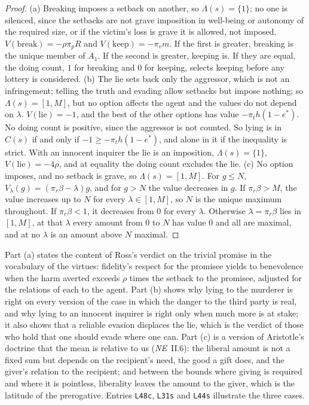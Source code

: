\documentclass{situationist-preprint}
\newcommand{\Ch}{C}
\begin{document}
\begin{proof}
(a) Breaking imposes a setback on another, so $\Lambda(s)=\{1\}$; no one is silenced, since the setbacks are not grave imposition in well-being or autonomy of the required size, or if the victim's loss is grave it is allowed, not imposed. $V(\text{break})=-\rho\pi_pR$ and $V(\text{keep})=-\pi_vm$. If the first is greater, breaking is the unique member of $A_1$. If the second is greater, keeping is. If they are equal, the doing count, $1$ for breaking and $0$ for keeping, selects keeping before any lottery is considered. (b) The lie sets back only the aggressor, which is not an infringement; telling the truth and evading allow setbacks but impose nothing; so $\Lambda(s)=[1,M]$, but no option affects the agent and the values do not depend on $\lambda$. $V(\text{lie})=-1$, and the best of the other options has value $-\pi_th(1-e^\ast)$. No doing count is positive, since the aggressor is not counted. So lying is in $\Ch(s)$ if and only if $-1\geq-\pi_th(1-e^\ast)$, and alone in it if the inequality is strict. With an innocent inquirer the lie is an imposition, $\Lambda(s)=\{1\}$, $V(\text{lie})=-4\rho$, and at equality the doing count excludes the lie. (c) No option imposes, and no setback is grave, so $\Lambda(s)=[1,M]$. For $g\leq N$, $V_\lambda(g)=(\pi_r\beta-\lambda)g$, and for $g>N$ the value decreases in $g$. If $\pi_r\beta>M$, the value increases up to $N$ for every $\lambda\in[1,M]$, so $N$ is the unique maximum throughout. If $\pi_r\beta<1$, it decreases from $0$ for every $\lambda$. Otherwise $\lambda=\pi_r\beta$ lies in $[1,M]$, at that $\lambda$ every amount from $0$ to $N$ has value $0$ and all are maximal, and at no $\lambda$ is an amount above $N$ maximal.
\end{proof}

Part (a) states the content of Ross's verdict on the trivial promise in the vocabulary of the virtues: fidelity's respect for the promisee yields to benevolence when the harm averted exceeds $\rho$ times the setback to the promisee, adjusted for the relations of each to the agent. Part (b) shows why lying to the murderer is right on every version of the case in which the danger to the third party is real, and why lying to an innocent inquirer is right only when much more is at stake; it also shows that a reliable evasion displaces the lie, which is the verdict of those who hold that one should evade where one can. Part (c) is a version of Aristotle's doctrine that the mean is relative to us (\emph{NE}~II.6): the liberal amount is not a fixed sum but depends on the recipient's need, the good a gift does, and the giver's relation to the recipient; and between the bounds where giving is required and where it is pointless, liberality leaves the amount to the giver, which is the latitude of the prerogative. Entries \texttt{L48c}, \texttt{L31s} and \texttt{L44s} illustrate the three cases.
\end{document}
